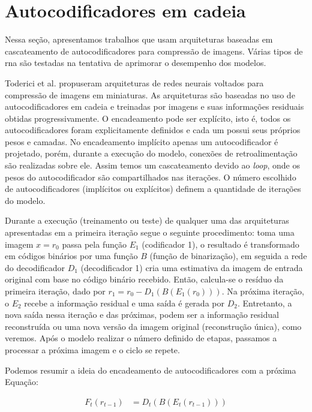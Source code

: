 \section{Autocodificadores em cadeia}
Nessa seção, apresentamos trabalhos que usam arquiteturas baseadas em cascateamento de autocodificadores para compressão de imagens. Várias tipos de \acrshort{rna} são testadas na tentativa de aprimorar o desempenho dos modelos.   


Toderici et al. \cite{Variable2016Toderici} propuseram arquiteturas de redes neurais voltados para compressão de imagens em miniaturas. As arquiteturas são baseadas no uso de autocodificadores em cadeia  e treinadas por  imagens e suas informações residuais obtidas progressivamente. 
O encadeamento pode ser explícito, isto é, todos os autocodificadores foram explicitamente definidos e cada um possui seus próprios pesos e camadas. 
No encadeamento implícito apenas um autocodificador é projetado, porém, durante a execução do modelo, conexões de retroalimentação são realizadas sobre ele. Assim temos um cascateamento devido ao \textit{loop}, onde os pesos do autocodificador são compartilhados nas iterações. O número escolhido de autocodificadores (implícitos ou explícitos)  definem a quantidade de iterações do modelo. 

Durante a execução (treinamento ou teste) de qualquer uma das arquiteturas apresentadas em \cite{Variable2016Toderici} a primeira iteração segue o seguinte procedimento: toma uma imagem $x = r_0$ passa pela função $E_1$ (codificador 1), o resultado é transformado em códigos binários por uma função $B$ (função de binarização), em seguida a rede do decodificador $D_1$ (decodificador 1) cria uma estimativa da imagem de entrada original com base no código binário recebido. Então, calcula-se o resíduo da primeira iteração, dado por $r_1 = r_0 - D_1(B(E_1(r_0)))$. 
Na próxima iteração, o $E_2$ recebe a informação residual e uma  saída é gerada por $D_2$.   Entretanto,  a nova saída nessa iteração e das próximas, podem ser a informação residual reconstruída ou uma nova versão da imagem original (reconstrução única), como veremos.  Após o modelo realizar o número definido de etapas, passamos a processar a próxima imagem e o ciclo se repete. 

Podemos resumir a ideia do encadeamento de autocodificadores com a próxima Equação: 

\begin{equation}
\begin{aligned}
F_t(r_{t-1}) &= D_t(B(E_t(r_{t-1}))) \\
\end{aligned}
\end{equation}

